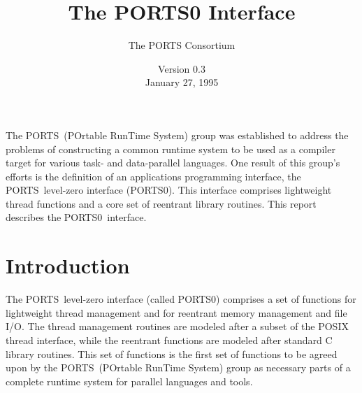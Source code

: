 
%
%
%

\textwidth 14.0cm
\textheight 21.5cm
\voffset -1in

\def\versionnumber{0.3}
\def\versiondate{January 27, 1995}


\def\SEC{{\bf \S}}
\def\APP{Appendix~}

\newcommand{\ports}{PORTS}
\newcommand{\portszero}{PORTS0}

\title{The PORTS0 Interface}

\author{The PORTS Consortium}

\date{Version \versionnumber\\
\versiondate}

\def\portsabstract{
The \ports\ (POrtable RunTime System) group was established to address
the problems of constructing a common runtime system to be used as a
compiler target for various task- and data-parallel languages.  One
result of this group's efforts is the definition of an applications
programming interface, the \ports\ level-zero interface (\portszero).
This interface comprises lightweight thread functions and a core set of
reentrant library routines.  This report describes the \portszero\
interface.}



\setcounter{page}{1}

\maketitle
\portsabstract
\thispagestyle{empty}
\newpage

\tableofcontents
\newpage

\setcounter{page}{1}

\section{Introduction}

The \ports\ level-zero interface (called \portszero)
comprises a set of functions for lightweight thread management
and for reentrant memory management and file I/O.  The thread
management routines are modeled after a subset of the POSIX thread
interface, while the reentrant functions are modeled after standard C
library routines.  This set of functions is the first set of functions
to be agreed upon by the \ports\ (POrtable RunTime System) group as
necessary parts of a complete runtime system for parallel languages
and tools.

